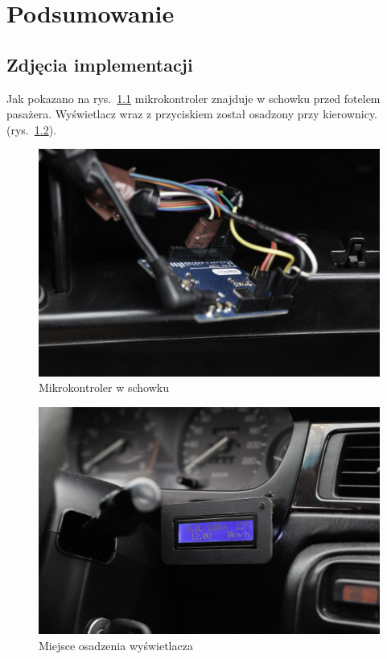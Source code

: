 \chapter{Podsumowanie}


\section{Zdjęcia implementacji}

Jak pokazano na rys.~\ref{fig:arduino_schowek} mikrokontroler znajduje w schowku przed fotelem pasażera. Wyświetlacz wraz z przyciskiem został osadzony przy kierownicy. (rys.~\ref{fig:arduino_lcd}).

\begin{figure}[!htb]
\centering
\includegraphics[width=0.8\linewidth]{Rysunki/arduino_schowek.jpg}
\caption{Mikrokontroler w schowku}
\label{fig:arduino_schowek}
\end{figure}
\begin{figure}[!htb]
\centering
\includegraphics[width=0.8\linewidth]{Rysunki/arduino_lcd.jpg}
\caption{Miejsce osadzenia wyświetlacza}
\label{fig:arduino_lcd}
\end{figure}


